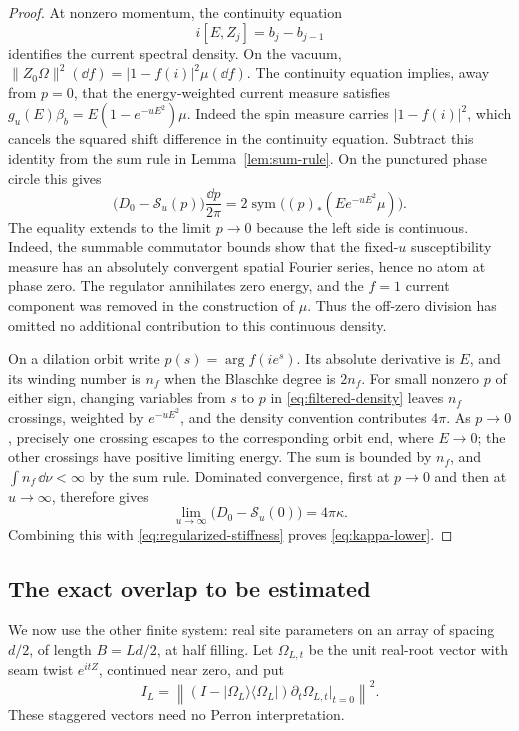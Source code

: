 \begin{proof}
At nonzero momentum, the continuity equation
\[
 i[E,Z_j]=b_j-b_{j-1}
\]
identifies the current spectral density. On the vacuum,
\(\|Z_0\Omega\|^2(\dd f)=|1-f(i)|^2\mu(\dd f)\).
The continuity equation implies, away from \(p=0\), that the
energy-weighted current measure satisfies
\(g_u(E)\beta_b=E(1-e^{-uE^2})\mu\).
Indeed the spin measure carries \(|1-f(i)|^2\), which cancels the
squared shift difference in the continuity equation. Subtract this
identity from the sum rule in Lemma~\ref{lem:sum-rule}. On the
punctured phase circle this gives
\begin{equation}\label{eq:filtered-density}
 \bigl(D_0-\mathcal S_u(p)\bigr)\frac{\dd p}{2\pi}
 =2\operatorname{sym}\bigl((p)_*(Ee^{-uE^2}\mu)\bigr).
\end{equation}
The equality extends to the limit \(p\to0\) because the left side
is continuous. Indeed, the summable commutator bounds show that the
fixed-\(u\) susceptibility measure has an absolutely convergent spatial
Fourier series, hence no atom at phase zero. The regulator annihilates
zero energy, and the \(f=1\) current component was removed in the
construction of \(\mu\). Thus the off-zero division has omitted no
additional contribution to this continuous density.

On a dilation orbit write \(p(s)=\arg f(ie^s)\).
Its absolute derivative is \(E\), and its winding number is \(n_f\)
when the Blaschke degree is \(2n_f\). For small nonzero \(p\) of either
sign, changing variables from \(s\) to \(p\) in
\eqref{eq:filtered-density} leaves \(n_f\) crossings, weighted by
\(e^{-uE^2}\), and the density convention contributes \(4\pi\).
As \(p\to0\), precisely one crossing escapes to the corresponding
orbit end, where \(E\to0\); the other crossings have positive limiting
energy. The sum is bounded by \(n_f\), and
\(\int n_f\,\dd\nu<\infty\) by the sum rule. Dominated convergence,
first at \(p\to0\) and then at \(u\to\infty\), therefore gives
\[
 \lim_{u\to\infty}\bigl(D_0-\mathcal S_u(0)\bigr)=4\pi\kappa.
\]
Combining this with \eqref{eq:regularized-stiffness} proves
\eqref{eq:kappa-lower}.
\end{proof}

\subsection{The exact overlap to be estimated}

We now use the other finite system: real site parameters on an array
of spacing \(d/2\), of length \(B=Ld/2\), at half filling.
Let \(\Omega_{L,t}\) be the unit real-root vector with seam twist
\(e^{itZ}\), continued near zero, and put
\begin{equation}\label{eq:fidelity-cost}
 I_L=\left\|(I-|\Omega_L\rangle\langle\Omega_L|)
           \partial_t\Omega_{L,t}\big|_{t=0}\right\|^2.
\end{equation}
These staggered vectors need no Perron interpretation.

